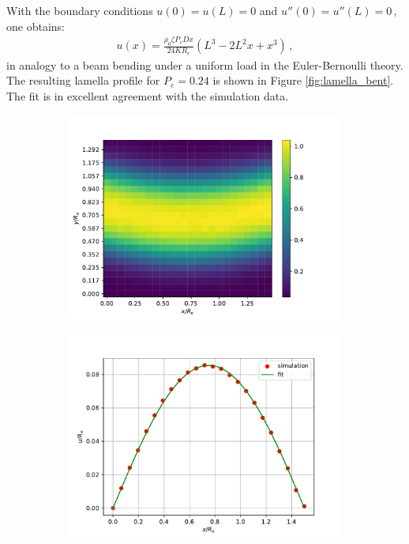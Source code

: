\documentclass[bachelor,       %
               twoside,        %
               BCOR10mm,       %
               ngerman, english %
               ]{GAUBM}
\begin{document}
With the boundary conditions $u(0)=u(L)=0$ and $u''(0)=u''(L)=0\,,$ one obtains:
\begin{align}
    u(x)=\frac{\rho_0\zeta P_e Dx}{24KR_e}(L^3-2L^2x+x^3)\,,
    \label{eq:deflection}
\end{align}
in analogy to a beam bending under a uniform load in the Euler-Bernoulli theory. The resulting lamella profile for $P_e=0.24$ is shown in Figure \ref{fig:lamella_bent}. The fit is in excellent agreement with the simulation data. 



\begin{figure}[h]
  \centering
  \begin{subfigure}[b]{0.45\textwidth}
      \centering
      \includegraphics[width=\textwidth]{figures/heatmap_t2000.pdf}
      \caption{}
      \label{fig:lamella_heatmap}
  \end{subfigure}
    \hfill
  \begin{subfigure}[b]{0.45\textwidth}
      \centering
      \includegraphics[width=\textwidth]{figures/lamella_profile_t2000.pdf}

\end{subfigure}
\end{figure}
\end{document}
